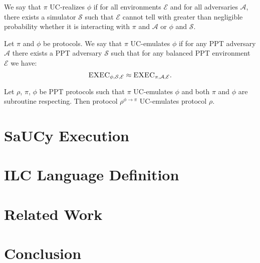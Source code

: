 \documentclass{llncs}
\newcommand{\mc}[1]{\mathcal{{#1}}}
\begin{document}
We say that $\pi$ UC-realizes $\phi$ if for all
environments $\mc{E}$ and for all adversaries $\mc{A}$, there exists a simulator
$\mc{S}$ such that $\mc{E}$ cannot tell with greater than negligible probability
whether it is interacting with $\pi$ and $\mc{A}$ or $\phi$ and $\mc{S}$.

\begin{definition}
Let $\pi$ and $\phi$ be protocols. We say that $\pi$ UC-emulates $\phi$ if for
any PPT adversary $\mc{A}$ there exists a PPT adversary $\mc{S}$ such that for
any balanced PPT environment $\mc{E}$ we have:
\begin{equation*}
\textsc{EXEC}_{\phi, \mc{S}, \mc{E}} \approx \textsc{EXEC}_{\pi, \mc{A}, \mc{E}}.
\end{equation*}
\end{definition}

\begin{theorem}
Let $\rho$, $\pi$, $\phi$ be PPT protocols such that $\pi$ UC-emulates $\phi$
and both $\pi$ and $\phi$ are subroutine respecting. Then protocol
$\rho^{\phi \rightarrow \pi}$ UC-emulates protocol $\rho$.
\end{theorem}

\section{SaUCy Execution}



\section{ILC Language Definition}

\section{Related Work}

\section{Conclusion}




\appendix
\end{document}
